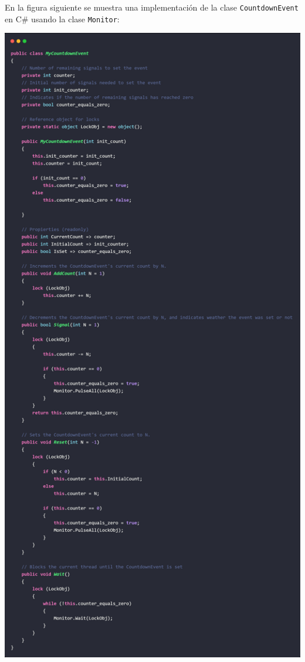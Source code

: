 \documentclass[10pt]{article} %
\newcommand{\csl}[1]{\colorbox{backcolour}{\texttt{#1}}}
\begin{document}
En la figura siguiente se muestra una implementación de la clase \csl{CountdownEvent} en C\# usando la clase \csl{Monitor}:

\begin{center}
	\includegraphics[width=15cm]{MyCountdownEvent.jpg}
\end{center}
\end{document}
